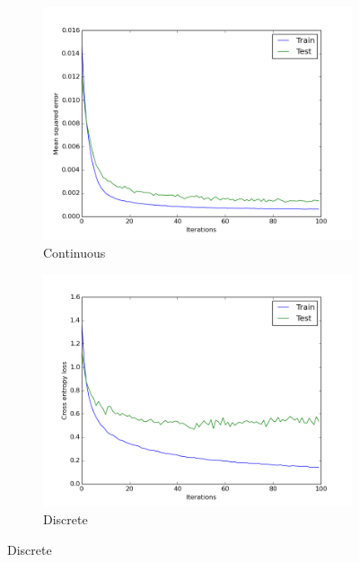 \documentclass[a4paper,11pt]{report}
\begin{document}
\begin{figure}[t]
\begin{subfigure}[b]{0.45\columnwidth}
    \includegraphics[clip=true,width=1.\textwidth]{figures/mse.png}
    \caption{Continuous}
    \label{fig:cont_results}
  \end{subfigure}
  \begin{subfigure}[b]{0.45\columnwidth}
    \includegraphics[clip=true,width=1.\textwidth]{figures/d_xent.png}
    \caption{Discrete}
    \label{fig:discrete_results}
  \end{subfigure} 
  

\end{figure}
\end{document}
